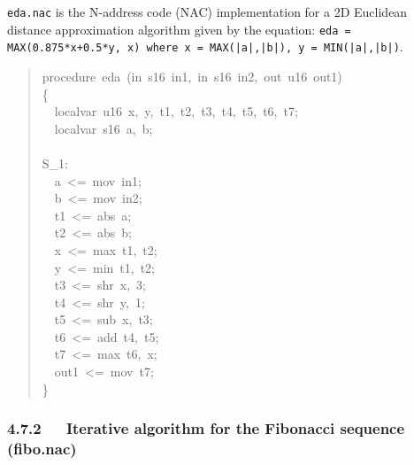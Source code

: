 \documentclass[a4paper]{article}
\begin{document}
\texttt{eda.nac} is the N-address code (NAC) implementation for a 2D Euclidean
distance approximation algorithm given by the equation:
\texttt{eda = MAX(0.875*x+0.5*y, x) where x = MAX(|a|,|b|), y = MIN(|a|,|b|)}.
%
\begin{quote}{\ttfamily \raggedright \noindent
procedure~eda~(in~s16~in1,~in~s16~in2,~out~u16~out1)\\
\{\\
~~localvar~u16~x,~y,~t1,~t2,~t3,~t4,~t5,~t6,~t7;\\
~~localvar~s16~a,~b;\\
~\\
S\_1:\\
~~a~<=~mov~in1;\\
~~b~<=~mov~in2;\\
~~t1~<=~abs~a;\\
~~t2~<=~abs~b;\\
~~x~<=~max~t1,~t2;\\
~~y~<=~min~t1,~t2;\\
~~t3~<=~shr~x,~3;\\
~~t4~<=~shr~y,~1;\\
~~t5~<=~sub~x,~t3;\\
~~t6~<=~add~t4,~t5;\\
~~t7~<=~max~t6,~x;\\
~~out1~<=~mov~t7;\\
\}
}
\end{quote}


\subsubsection{4.7.2~~~Iterative algorithm for the Fibonacci sequence (fibo.nac)%
  \label{iterative-algorithm-for-the-fibonacci-sequence-fibo-nac}%
}
\end{document}
